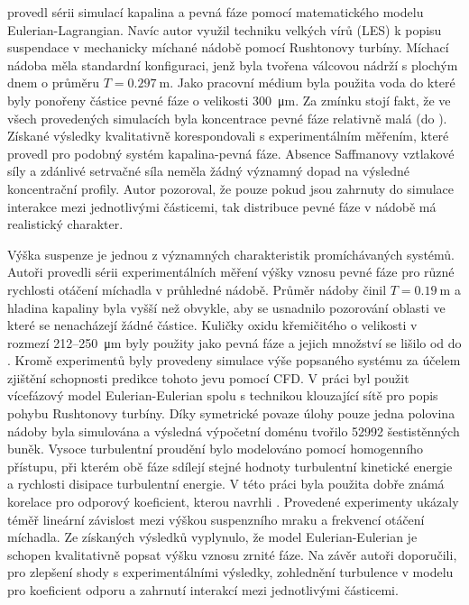 \citet{derk03} provedl sérii simulací kapalina a pevná fáze pomocí matematického modelu Eulerian-Lagrangian. Navíc autor využil techniku velkých vírů (LES) k popisu suspendace v mechanicky míchané nádobě pomocí Rushtonovy turbíny. Míchací nádoba měla standardní konfiguraci, jenž byla tvořena válcovou nádrží s plochým dnem o průměru $T=\SI{0.297}{\meter}$. Jako pracovní médium byla použita voda do které byly ponořeny částice pevné fáze o velikosti \SI{300}{\micro\meter}. Za zmínku stojí fakt, že ve všech provedených simulacích byla koncentrace pevné fáze relativně malá (do ). Získané výsledky kvalitativně korespondovali s experimentálním měřením, které provedl \citet{miche03} pro podobný systém kapalina-pevná fáze. Absence Saffmanovy vztlakové síly a zdánlivé setrvačné síla neměla žádný významný dopad na výsledné koncentrační profily. Autor pozoroval, že pouze pokud jsou zahrnuty do simulace interakce mezi jednotlivými částicemi, tak distribuce pevné fáze v nádobě má realistický charakter. 

Výška suspenze je jednou z významných charakteristik promíchávaných systémů. Autoři \citet{mic04} provedli sérii experimentálních měření výšky vznosu pevné fáze pro různé rychlosti otáčení míchadla v průhledné nádobě. Průměr nádoby činil $T=\SI{0.19}{\meter}$ a hladina kapaliny byla vyšší než obvykle, aby se usnadnilo pozorování oblasti ve které se nenacházejí žádné částice. Kuličky oxidu křemičitého o velikosti v rozmezí \num{212}--\SI{250}{\micro\meter} byly použity jako pevná fáze a jejich množství se lišilo od  do . Kromě experimentů byly provedeny simulace výše popsaného systému za účelem zjištění schopnosti predikce tohoto jevu pomocí CFD. V práci byl použit vícefázový model Eulerian-Eulerian spolu s technikou klouzající sítě pro popis pohybu Rushtonovy turbíny. Díky symetrické povaze úlohy pouze jedna polovina nádoby byla simulována a výsledná výpočetní doménu tvořilo \num{52992} šestistěnných buněk. Vysoce turbulentní proudění bylo modelováno pomocí homogenního \keps{} přístupu, při kterém obě fáze sdílejí stejné hodnoty turbulentní kinetické energie a rychlosti disipace turbulentní energie. V této práci byla použita dobře známá korelace pro odporový koeficient, kterou navrhli \citet{schi32}. Provedené experimenty ukázaly téměř lineární závislost mezi výškou suspenzního mraku a frekvencí otáčení míchadla. Ze získaných výsledků vyplynulo, že model Eulerian-Eulerian je schopen kvalitativně popsat výšku vznosu zrnité fáze. Na závěr autoři doporučili, pro zlepšení shody s experimentálními výsledky, zohlednění turbulence v modelu pro koeficient odporu a zahrnutí interakcí mezi jednotlivými částicemi.

